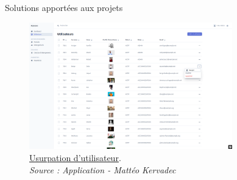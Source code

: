 \documentclass{beamer}
\begin{document}
\begin{frame}{Solutions apportées aux projets}
\begin{center}
		 {
			\addtocounter{figure}{3}
			\begin{figure}[t]
  				\includegraphics[height=5.5cm]{../img/localhost/usurpation.png}
				\caption{	
					\centering			
  					\href{https://github.com/Matteo-K/Soutenance_E-delic/blob/main/img/localhost/usurpation.png}{\underline{Usurpation d'utilisateur}}.\\
  					\textit{Source : Application - Mattéo Kervadec}
				}
  				\label{fig:usurpation}
  			\end{figure}
		}
  		
	\end{center}
	\vfill
\end{frame}
\end{document}
